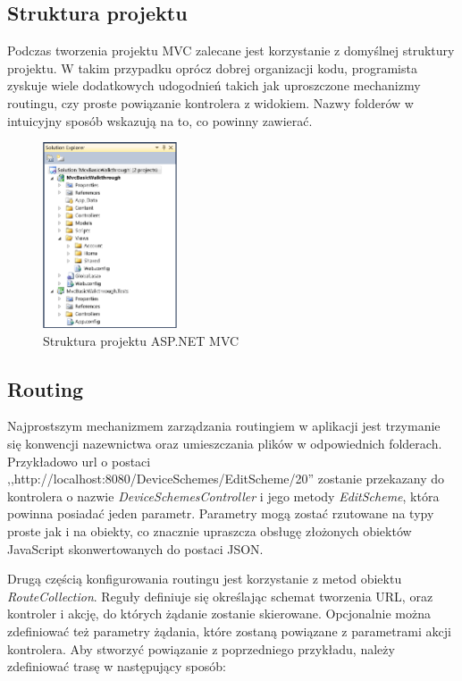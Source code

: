 \subsection{Struktura projektu}
Podczas tworzenia projektu MVC zalecane jest korzystanie z domyślnej struktury projektu. W takim przypadku oprócz dobrej organizacji kodu, programista zyskuje wiele dodatkowych udogodnień takich jak uproszczone mechanizmy routingu, czy proste powiązanie kontrolera z widokiem. Nazwy folderów w intuicyjny sposób wskazują na to, co powinny zawierać. 

\begin{figure}[h]
	\includegraphics[height=55mm]{./img/mvc-project-structure.png}
	\caption{Struktura projektu ASP.NET MVC}
	\label{fig:mvc-project-structure}
\end{figure}

\subsection{Routing}
Najprostszym mechanizmem zarządzania routingiem w aplikacji jest trzymanie się konwencji nazewnictwa oraz umieszczania plików w odpowiednich folderach. Przykładowo url o postaci ,,http://localhost:8080/DeviceSchemes/EditScheme/20'' zostanie przekazany do kontrolera o nazwie \textit{DeviceSchemesController} i jego metody \textit{EditScheme}, która powinna posiadać jeden parametr. Parametry mogą zostać rzutowane na typy proste jak i na obiekty, co znacznie upraszcza obsługę złożonych obiektów JavaScript skonwertowanych do postaci JSON. 

Drugą częścią konfigurowania routingu jest korzystanie z metod obiektu \textit{RouteCollection}. Reguły definiuje się określając schemat tworzenia URL, oraz kontroler i akcję, do których żądanie zostanie skierowane. Opcjonalnie można zdefiniować też parametry żądania, które zostaną powiązane z parametrami akcji kontrolera. Aby stworzyć powiązanie z poprzedniego przykładu, należy zdefiniować trasę w następujący sposób:

